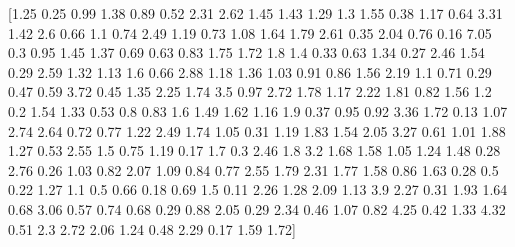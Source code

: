\documentclass[preview]{standalone}
\begin{document}
\begin{center}
[1.25 0.25 0.99 1.38 0.89 0.52 2.31 2.62 1.45 1.43 1.29 1.3  1.55 0.38
 1.17 0.64 3.31 1.42 2.6  0.66 1.1  0.74 2.49 1.19 0.73 1.08 1.64 1.79
 2.61 0.35 2.04 0.76 0.16 7.05 0.3  0.95 1.45 1.37 0.69 0.63 0.83 1.75
 1.72 1.8  1.4  0.33 0.63 1.34 0.27 2.46 1.54 0.29 2.59 1.32 1.13 1.6
 0.66 2.88 1.18 1.36 1.03 0.91 0.86 1.56 2.19 1.1  0.71 0.29 0.47 0.59
 3.72 0.45 1.35 2.25 1.74 3.5  0.97 2.72 1.78 1.17 2.22 1.81 0.82 1.56
 1.2  0.2  1.54 1.33 0.53 0.8  0.83 1.6  1.49 1.62 1.16 1.9  0.37 0.95
 0.92 3.36 1.72 0.13 1.07 2.74 2.64 0.72 0.77 1.22 2.49 1.74 1.05 0.31
 1.19 1.83 1.54 2.05 3.27 0.61 1.01 1.88 1.27 0.53 2.55 1.5  0.75 1.19
 0.17 1.7  0.3  2.46 1.8  3.2  1.68 1.58 1.05 1.24 1.48 0.28 2.76 0.26
 1.03 0.82 2.07 1.09 0.84 0.77 2.55 1.79 2.31 1.77 1.58 0.86 1.63 0.28
 0.5  0.22 1.27 1.1  0.5  0.66 0.18 0.69 1.5  0.11 2.26 1.28 2.09 1.13
 3.9  2.27 0.31 1.93 1.64 0.68 3.06 0.57 0.74 0.68 0.29 0.88 2.05 0.29
 2.34 0.46 1.07 0.82 4.25 0.42 1.33 4.32 0.51 2.3  2.72 2.06 1.24 0.48
 2.29 0.17 1.59 1.72]
\end{center}
\end{document}
